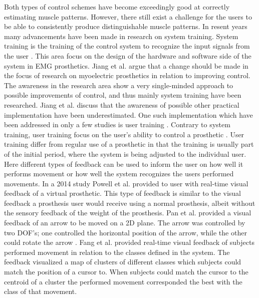 Both types of control schemes have become exceedingly good at correctly estimating muscle patterns. \cite{Hahne2014, Bruun2017, Englehart2003, Scheme2015} However, there still exist a challenge for the users to be able to consistently produce distinguishable muscle patterns. \cite{Powell2014} In resent years many advancements have been made in research on system training. System training is the training of the control system to recognize the input signals from the user \cite{Fougner2012}. This area focus on the design of the hardware and software side of the system in EMG prosthetics. Jiang et al. \cite{Jiang2012} argue that a change should be made in the focus of research on myoelectric prosthetics in relation to improving control. The awareness in the research area show a very single-minded approach to possible improvements of control, and thus mainly system training have been researched. Jiang et al. \cite{Jiang2012} discuss that the awareness of possible other practical implementation have been underestimated. One such implementation which have been addressed in only a few studies is user training \cite{Fang2017, Powell2014, Pan2017}. Contrary to system training, user training focus on the user's ability to control a prosthetic \cite{Fougner2012}. User training differ from regular use of a prosthetic in that the training is usually part of the initial period, where the system is being adjusted to the individual user. Here different types of feedback can be used to inform the user on how well it performs movement or how well the system recognizes the users performed movements. In a 2014 study Powell et al. \cite{Powell2014} provided to user with real-time visual feedback of a virtual prosthetic. This type of feedback is similar to the visual feedback a prosthesis user would receive using a normal prosthesis, albeit without the sensory feedback of the weight of the prosthesis. Pan et al. \cite{Pan2017} provided a visual feedback of an arrow to be moved on a 2D plane. The arrow was controlled by two DOF's; one controlled the horizontal position of the arrow, while the other could rotate the arrow \cite{Pan2017}. Fang et al. \cite{Fang2017} provided real-time visual feedback of subjects performed movement in relation to the classes defined in the system. The feedback visualized a map of clusters of different classes which subjects could match the position of a cursor to. When subjects could match the cursor to the centroid of a cluster the performed movement corresponded the best with the class of that movement. \cite{Fang2017} 

